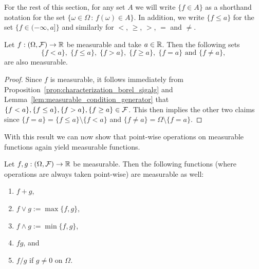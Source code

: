 For the rest of this section, for any set $A$ we will write $\{f \in A\}$ as a shorthand notation for the set $\{\omega \in \Omega \, :\, f(\omega) \in A\}$. In addition, we write $\{f \le a\}$ for the set $\{f \in (-\infty, a]\}$ and similarly for $<$, $\ge$, $>$, $=$ and $\ne$.

\begin{lemma}\label{lem:measurable_set_real_line}
Let $f : (\Omega, \mathcal F) \to \mathbb R$ be measurable and take $a \in \mathbb R$. Then the following sets 
\[
	\{f < a\},\; \{f \le a\},\; \{f > a\},\; \{f \ge a\},\; \{f = a\} \text{ and } \{f \ne a\},
\]
are also measurable.
\end{lemma}

\begin{proof}
Since $f$ is measurable, it follows immediately from Proposition~\ref{prop:characterization_borel_sigalg} and Lemma~\ref{lem:measurable_condition_generator} that $\{f < a\}, \{f \le a\},\{f > a\}, \{f \ge a\} \in \mathcal F$. This then implies the other two claims since $\{f = a\} = \{f \le a\} \setminus \{f < a\}$ and $\{f \ne a\} = \Omega \setminus \{f = a\}$.
\end{proof}

With this result we can now show that point-wise operations on measurable functions again yield measurable functions.

\begin{lemma}\label{lem:basic_properties_measurable_functions}
Let $f, g : (\Omega, \mathcal F) \to \mathbb R$ be measurable. Then the following functions (where operations are always taken point-wise) are measurable as well:
\begin{enumerate}[label=(\arabic*)]
\item $f + g$,
\item $f \vee g := \max\{f,g\}$,
\item $f \wedge g := \min\{f,g\}$,
\item $f g$, and
\item $f/g$ if $g \ne 0$ on $\Omega$.
\end{enumerate} 
\end{lemma}

